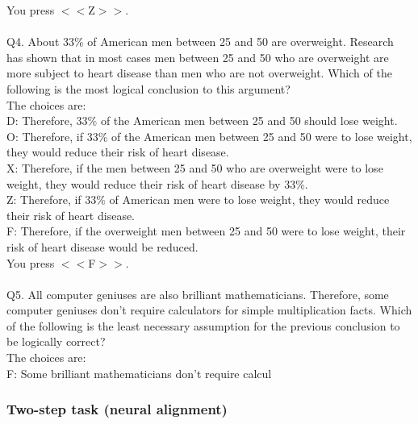 \documentclass[pdflatex,sn-nature]{sn-jnl}%
\theoremstyle{thmstyleone}%
\theoremstyle{thmstyletwo}%
\theoremstyle{thmstylethree}%
\begin{document}
You press $<<$Z$>>$. $~$\\ 
 $~$\\ 
Q4. About 33\% of American men between 25 and 50 are overweight. Research has shown that in most cases men between 25 and 50 who are overweight are more subject to heart disease than men who are not overweight. Which of the following is the most logical conclusion to this argument? $~$\\ 
The choices are: $~$\\ 
D: Therefore, 33\% of the American men between 25 and 50 should lose weight. $~$\\ 
O: Therefore, if 33\% of the American men between 25 and 50 were to lose weight, they would reduce their risk of heart disease. $~$\\ 
X: Therefore, if the men between 25 and 50 who are overweight were to lose weight, they would reduce their risk of heart disease by 33\%. $~$\\ 
Z: Therefore, if 33\% of American men were to lose weight, they would reduce their risk of heart disease. $~$\\ 
F: Therefore, if the overweight men between 25 and 50 were to lose weight, their risk of heart disease would be reduced. $~$\\ 
You press $<<$F$>>$. $~$\\ 
 $~$\\ 
Q5. All computer geniuses are also brilliant mathematicians. Therefore, some computer geniuses don't require calculators for simple multiplication facts. Which of the following is the least necessary assumption for the previous conclusion to be logically correct? $~$\\ 
The choices are: $~$\\ 
F: Some brilliant mathematicians don't require calcul

\subsubsection*{Two-step task (neural alignment)}
\end{document}
